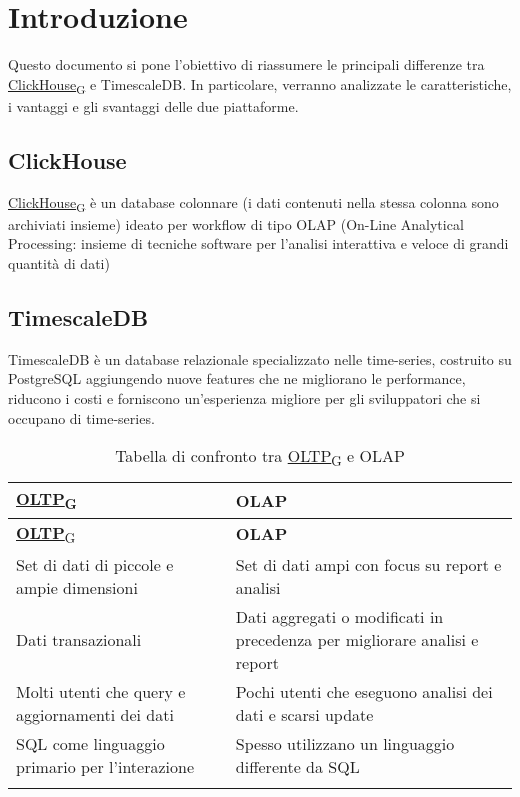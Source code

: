 \section{Introduzione}
Questo documento si pone l'obiettivo di riassumere le principali differenze tra  \href{https://7last.github.io/docs/pb/documentazione-interna/glossario\#clickhouse}{ClickHouse\textsubscript{G}} e TimescaleDB.
In particolare, verranno analizzate le caratteristiche, i vantaggi e gli svantaggi delle due piattaforme.\\

\subsection{ClickHouse}
\href{https://7last.github.io/docs/pb/documentazione-interna/glossario\#clickhouse}{ClickHouse\textsubscript{G}} è un database colonnare (i dati contenuti nella stessa colonna sono archiviati insieme) ideato per workflow di tipo OLAP (On-Line Analytical Processing: insieme di tecniche software per l'analisi interattiva e veloce di grandi quantità di dati)

\subsection{TimescaleDB}
TimescaleDB è un database relazionale specializzato nelle time-series, costruito su PostgreSQL aggiungendo nuove features che ne migliorano le performance, riducono i costi e forniscono un’esperienza migliore per gli sviluppatori che si occupano di time-series.

\begin{longtable}{|>{\raggedright\arraybackslash}m{}|>{\raggedright\arraybackslash}m{}|}
	\hline
	\href{https://7last.github.io/docs/pb/documentazione-interna/glossario\#online-transaction-processing}{\textbf{OLTP}\textsubscript{G}} & \textbf{OLAP}\\
	\hline
	\endfirsthead
	\hline
	\href{https://7last.github.io/docs/pb/documentazione-interna/glossario\#online-transaction-processing}{\textbf{OLTP}\textsubscript{G}} & \textbf{OLAP}\\
	\endhead
	 Set di dati di piccole e ampie dimensioni  & Set di dati ampi con focus su report e analisi\\
	\hline
	 Dati transazionali  & Dati aggregati o modificati in precedenza per migliorare analisi e report \\
	\hline
	 Molti utenti che query e aggiornamenti dei dati & Pochi utenti che eseguono analisi dei dati e scarsi update    \\
	\hline
     SQL come linguaggio primario per l'interazione & Spesso utilizzano un linguaggio differente da SQL    \\
	\hline
	\caption{Tabella di confronto tra \href{https://7last.github.io/docs/pb/documentazione-interna/glossario\#online-transaction-processing}{OLTP\textsubscript{G}} e OLAP}
	\label{table:1}
\end{longtable}